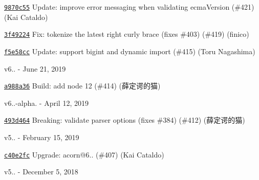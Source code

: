 \begin{DoxyItemize}
\item \href{https://github.com/eslint/espree/commit/9870c553efd3eb1bd22b4b3bb5220896c5cb6933}{\texttt{ {\ttfamily 9870c55}}} Update\+: improve error messaging when validating ecma\+Version (\#421) (Kai Cataldo)
\item \href{https://github.com/eslint/espree/commit/3f49224eb05f6b8cb1b996ce424a99c40978b389}{\texttt{ {\ttfamily 3f49224}}} Fix\+: tokenize the latest right curly brace (fixes \#403) (\#419) (finico)
\item \href{https://github.com/eslint/espree/commit/f5e58cc5e9030793baca3426366b8d7286ef5b89}{\texttt{ {\ttfamily f5e58cc}}} Update\+: support bigint and dynamic import (\#415) (Toru Nagashima)
\end{DoxyItemize}

v6.. -\/ June 21, 2019


\begin{DoxyItemize}
\item \href{https://github.com/eslint/espree/commit/a988a36e436a1ab6c84005ba0adb6cf9c262c1ec}{\texttt{ {\ttfamily a988a36}}} Build\+: add node 12 (\#414) (薛定谔的猫)
\end{DoxyItemize}

v6..-\/alpha. -\/ April 12, 2019


\begin{DoxyItemize}
\item \href{https://github.com/eslint/espree/commit/493d464e1564aea0ea33000389771d42ddece2cb}{\texttt{ {\ttfamily 493d464}}} Breaking\+: validate parser options (fixes \#384) (\#412) (薛定谔的猫)
\end{DoxyItemize}

v5.. -\/ February 15, 2019


\begin{DoxyItemize}
\item \href{https://github.com/eslint/espree/commit/c40e2fcedf81ff06151e82bdf655d2d0d29e71b8}{\texttt{ {\ttfamily c40e2fc}}} Upgrade\+: acorn@6.. (\#407) (Kai Cataldo)
\end{DoxyItemize}

v5.. -\/ December 5, 2018


